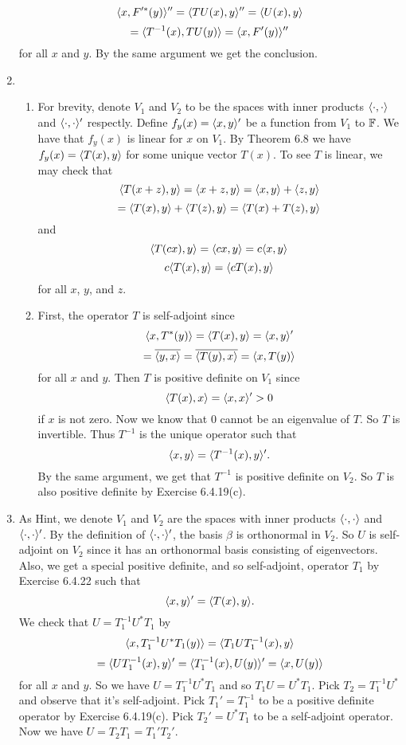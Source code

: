 \begin{enumerate}
\[\langle x,F'^*(y)\rangle''=\langle TU(x),y\rangle''=\langle U(x),y\rangle \]
\[=\langle T^{-1}(x),TU(y)\rangle =\langle x,F'(y)\rangle'' \]
for all $x$ and $y$. By the same argument we get the conclusion.
\item \begin{enumerate}
\item For brevity, denote $V_1$ and $V_2$ to be the spaces with inner products $\langle \cdot,\cdot \rangle $ and $\langle \cdot,\cdot \rangle'$ respectly. Define $f_y(x)=\langle x,y\rangle'$ be a function from $V_1$ to $\mathbb{F}$. We have that $f_y(x)$ is linear for $x$ on $V_1$. By Theorem 6.8 we have $f_y(x)=\langle T(x),y\rangle $ for some unique vector $T(x)$. To see $T$ is linear, we may check that 
\[\langle T(x+z),y\rangle =\langle x+z,y\rangle =\langle x,y\rangle+\langle z,y\rangle \]
\[=\langle T(x),y\rangle +\langle T(z),y\rangle=\langle T(x)+T(z),y\rangle \]
and 
\[\langle T(cx),y\rangle =\langle cx,y\rangle =c\langle x,y\rangle \]
\[c\langle T(x),y\rangle =\langle cT(x),y\rangle \]
for all $x$, $y$, and $z$.
\item First, the operator $T$ is self-adjoint since 
\[\langle x,T^*(y)\rangle =\langle T(x),y\rangle =\langle x,y\rangle'\]
\[=\overline{\langle y,x\rangle}=\overline{\langle T(y),x\rangle }=\langle x,T(y)\rangle\]
for all $x$ and $y$. Then $T$ is positive definite on $V_1$ since 
\[\langle T(x),x\rangle =\langle x,x\rangle'>0\]
if $x$ is not zero. Now we know that $0$ cannot be an eigenvalue of $T$. So $T$ is invertible. Thus $T^{-1}$ is the unique operator such that 
\[\langle x,y\rangle =\langle T^{-1}(x),y\rangle'.\]
By the same argument, we get that $T^{-1}$ is positive definite on $V_2$. So $T$ is also positive definite by Exercise 6.4.19(c).
\end{enumerate}
\item As Hint, we denote $V_1$ and $V_2$ are the spaces with inner products $\langle \cdot ,\cdot \rangle $ and $\langle \cdot ,\cdot \rangle' $. By the definition of $\langle \cdot,\cdot \rangle'$, the basis $\beta $ is orthonormal in $V_2$. So $U$ is self-adjoint on $V_2$ since it has an orthonormal basis consisting of eigenvectors. Also, we get a special positive definite, and so self-adjoint, operator $T_1$ by Exercise 6.4.22 such that 
\[\langle x,y\rangle' =\langle T(x),y\rangle.\]
We check that $U=T_1^{-1}U^*T_1$ by 
\[\langle x, T_1^{-1}U^*T_1(y)\rangle =\langle T_1UT_1^{-1}(x),y\rangle \]
\[=\langle UT_1^{-1}(x),y\rangle '=\langle T_1^{-1}(x),U(y)\rangle' =\langle x,U(y)\rangle \]
for all $x$ and $y$. So we have $U=T_1^{-1}U^*T_1$ and so $T_1U=U^*T_1$. Pick $T_2=T_1^{-1}U^*$ and observe that it's self-adjoint. Pick $T_1'=T_1^{-1}$ to be a positive definite operator by Exercise 6.4.19(c). Pick $T_2'=U^*T_1$ to be a self-adjoint operator. Now we have $U=T_2T_1=T_1'T_2'$.

\end{enumerate}
